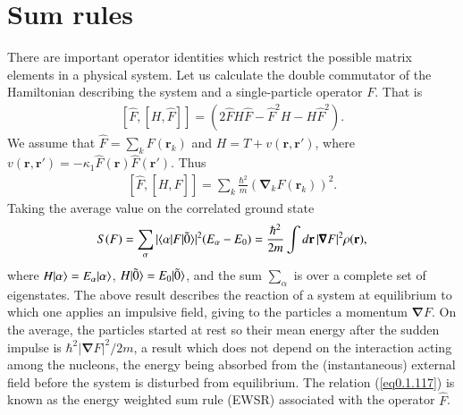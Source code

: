 \section{Sum rules}\label{Sect1.7}
There are important operator identities which restrict the possible matrix elements in a physical system. Let us calculate the double commutator of the Hamiltonian describing the system and a single-particle operator $F$. That is
\begin{align}\label{eq0.1.115}
\left[\hat F,\left[H,\hat F\right]\right]=\left(2\hat FH\hat F-\hat F^2H-H\hat F^2\right).
\end{align}
We assume that $\hat F=\sum_k F(\mathbf r_k)$ and $H=T+v(\mathbf r, \mathbf r')$, where $v(\mathbf r,\mathbf r')=-\kappa_1 \hat F(\mathbf r)\hat F(\mathbf r')$. Thus 
\begin{align}\label{eq0.1.116}
\left[\hat F,\left[H,\hat F\right]\right]=\sum_k\frac{\hbar^2}{m}\left(\pmb \nabla_kF(\mathbf r_k)\right)^2.
\end{align}
 Taking the average value on the correlated ground state
\begin{align}\label{eq0.1.117}
S(F)=\sum_{\alpha}|\langle {\alpha|F|\tilde 0} \rangle|^2(E_{\alpha}-E_0)=\frac{\hbar^2}{2m}\int d\mathbf r\, |\pmb\nabla F|^2\rho(\mathbf r),
\end{align}
where  $H|{\alpha} \rangle=E_\alpha|{\alpha} \rangle$, $H|{\tilde 0} \rangle=E_0|{\tilde 0} \rangle$, and the sum $\sum_{\alpha}$ is over a complete set of eigenstates. The above result describes the reaction of a system at equilibrium to which one applies an impulsive field, giving to the particles a momentum $\pmb \nabla F$. On the average, the particles started at rest so their mean energy after the sudden impulse is $\hbar^2|\pmb \nabla F|^2/2m$, a result which does not depend on the interaction acting among the nucleons, the energy being absorbed from the (instantaneous) external field before the system is disturbed from equilibrium. The relation (\ref{eq0.1.117}) is known as the energy weighted sum rule (EWSR) associated with the operator $\hat F$. 

